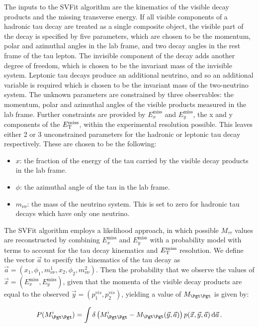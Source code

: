 The inputs to the SVFit algorithm are the kinematics of the visible decay
products and the missing transverse energy. If all visible components of a
hadronic tau decay are treated as a single composite object, the visible part of
the decay is specified by five parameters, which are chosen to be the momentum,
polar and azimuthal angles in the lab frame, and two decay angles in the rest
frame of the tau lepton. The invisible component of the decay adds another
degree of freedom, which is chosen to be the invariant mass of the invisible
system. Leptonic tau decays produce an additional neutrino, and so an additional
variable is required which is chosen to be the invariant mass of the
two-neutrino system. The unknown parameters are constrained by three
observables: the momentum, polar and azimuthal angles of the visible products
measured in the lab frame. Further constraints are provided by
$E_{x}^{\text{miss}}$ and $E_{y}^{\text{miss}}$, the x and y components of the
$E_{\mathrm{T}}^{\text{miss}}$, within the experimental resolution possible. This leaves either 2 or 3 
unconstrained parameters for the hadronic or leptonic tau decay respectively. 
These are chosen to be the following:

\begin{itemize}
\item $x$: the fraction of the energy of the tau carried by the visible decay
products in the lab frame.
\item $\phi$: the azimuthal angle of the tau in the lab frame. 
\item $m_{\nu\nu}$: the mass of the neutrino system. This is set to zero for hadronic tau
decays which have only one neutrino.
\end{itemize}

The SVFit algorithm employs a likelihood approach, in which possible
$M_{\tau\tau}$ values are reconstructed by combining $E_{x}^{\text{miss}}$ and
$E_{y}^{\text{miss}}$ with a probability model with terms to account for the tau
decay kinematics and $E_{\mathrm{T}}^{\text{miss}}$ resolution. We define the vector $\vec{a}$ to
specify the kinematics of the tau decay as $\vec{a} =
\left(x_{1},\phi_{1},m_{\nu\nu}^{1},x_{2},\phi_{2},m_{\nu\nu}^{2}\right)$. Then the
probability that we observe the values of $\vec{x} = \left(E_{x}^{\text{miss}},
E_{y}^{\text{miss}}\right)$, given that the momenta of the visible decay products are
equal to the observed $\vec{y} = \left(p_{1}^{vis},p_{2}^{vis} \right)$,
yielding a value of $M_{\Pgt\Pgt}$ is given by: 

\begin{equation} \label{eqn:svfit-prob}
P(M_{\Pgt\Pgt}^{i}) = \int\delta\left(M_{\Pgt\Pgt}^{i} -
M_{\Pgt\Pgt}(\vec{y},\vec{a})\right)p(\vec{x},\vec{y},\vec{a})\,\text{d}\vec{a}\,
.
\end{equation}

